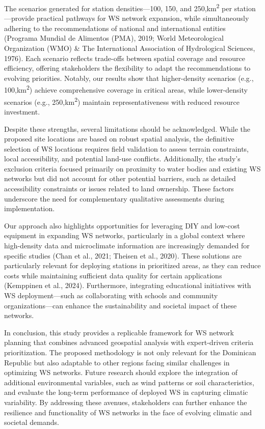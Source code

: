 \documentclass[spanish]{article}
\begin{document}
The scenarios generated for station densities---100, 150, and
250,km\textsuperscript{2} per station---provide practical pathways for
WS network expansion, while simultaneously adhering to the
recommendations of national and international entities (Programa Mundial
de Alimentos (PMA), 2019; World Meteorological Organization (WMO) \& The
International Association of Hydrological Sciences, 1976). Each scenario
reflects trade-offs between spatial coverage and resource efficiency,
offering stakeholders the flexibility to adapt the recommendations to
evolving priorities. Notably, our results show that higher-density
scenarios (e.g., 100,km\textsuperscript{2}) achieve comprehensive
coverage in critical areas, while lower-density scenarios (e.g.,
250,km\textsuperscript{2}) maintain representativeness with reduced
resource investment.

Despite these strengths, several limitations should be acknowledged.
While the proposed site locations are based on robust spatial analysis,
the definitive selection of WS locations requires field validation to
assess terrain constraints, local accessibility, and potential land-use
conflicts. Additionally, the study's exclusion criteria focused
primarily on proximity to water bodies and existing WS networks but did
not account for other potential barriers, such as detailed accessibility
constraints or issues related to land ownership. These factors
underscore the need for complementary qualitative assessments during
implementation.

Our approach also highlights opportunities for leveraging DIY and
low-cost equipment in expanding WS networks, particularly in a global
context where high-density data and microclimate information are
increasingly demanded for specific studies (Chan et al., 2021; Theisen
et al., 2020). These solutions are particularly relevant for deploying
stations in prioritized areas, as they can reduce costs while
maintaining sufficient data quality for certain applications (Kemppinen
et al., 2024). Furthermore, integrating educational initiatives with WS
deployment---such as collaborating with schools and community
organizations---can enhance the sustainability and societal impact of
these networks.

In conclusion, this study provides a replicable framework for WS network
planning that combines advanced geospatial analysis with expert-driven
criteria prioritization. The proposed methodology is not only relevant
for the Dominican Republic but also adaptable to other regions facing
similar challenges in optimizing WS networks. Future research should
explore the integration of additional environmental variables, such as
wind patterns or soil characteristics, and evaluate the long-term
performance of deployed WS in capturing climatic variability. By
addressing these avenues, stakeholders can further enhance the
resilience and functionality of WS networks in the face of evolving
climatic and societal demands.
\end{document}
